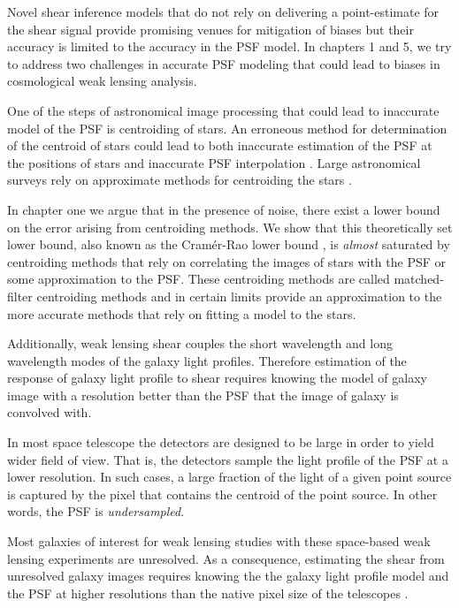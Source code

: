 Novel shear inference models that do not rely on delivering a point-estimate for the shear signal \citep{schneider,bernstein,huff,sheldon} 
provide promising venues for mitigation of biases but their accuracy is limited to the accuracy in the PSF model.
In chapters 1 and 5, we try to address two challenges in accurate PSF modeling that could lead to biases in cosmological weak lensing analysis. 

One of the steps of astronomical image processing that could lead to inaccurate model of the PSF is centroiding 
of stars. An erroneous method for determination of the centroid of stars could lead to both inaccurate estimation of the 
PSF at the positions of stars and inaccurate PSF interpolation \citep{anderson2000,lupton,anderson2003,desc}. Large astronomical surveys rely on approximate 
methods for centroiding the stars \citep{sextractor,sdss,des}. 

In chapter one we argue that in the presence of noise, there exist
a lower bound on the error arising from centroiding methods. We show that this theoretically set lower bound, also known as the Cram\'{e}r-Rao lower bound \citep{lecam}, 
is \emph{almost} saturated by centroiding methods that rely on correlating the images of stars with the PSF or some approximation to the 
PSF. These centroiding methods are called matched-filter centroiding methods and in certain limits provide an approximation to the more accurate 
methods that rely on fitting a model to the stars. 

Additionally, weak lensing shear couples the short wavelength and long wavelength modes of the galaxy light profiles. 
Therefore estimation of the response of galaxy light profile to shear requires knowing the model of galaxy image 
with a resolution better than the PSF that the image of galaxy is convolved with. 

In most space telescope \citep{euclid,wfirst} the detectors are designed to be large in order to yield wider field of view. 
That is, the detectors sample the light profile of the PSF at a lower resolution. In such cases, a large fraction of the light of a given point source 
is captured by the pixel that contains the centroid of the point source. In other words, the PSF is \emph{undersampled}.

Most galaxies of interest for weak lensing studies with these space-based weak lensing experiments are unresolved. 
As a consequence, estimating the shear from unresolved galaxy images requires 
knowing the the galaxy light profile model and the PSF at higher resolutions than the native pixel size of the telescopes \citep{olic,ngole2}.

